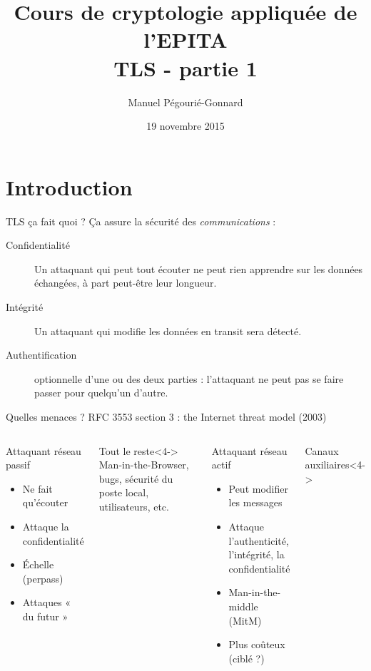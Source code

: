 \documentclass{mpg-ep-slides}
\author[MPG]{Manuel Pégourié-Gonnard}
\institute[ARM]{\normalsize ARM France - IoT - mbed TLS}
\title{Cours de cryptologie appliquée de l'EPITA \\ TLS - partie 1}
\date{19 novembre 2015}
\begin{document}
\maketitle

\section{Introduction}
\tocsect

\begin{frame}{TLS ça fait quoi ?}
  Ça assure la sécurité des \emph{communications} :
  \begin{description}
    \item[Confidentialité] Un attaquant qui peut tout écouter ne peut rien
      apprendre sur les données échangées, à part peut-être leur longueur.
    \item[Intégrité] Un attaquant qui modifie les données en transit sera
      détecté.
    \item[Authentification] optionnelle d'une ou des deux parties :
      l'attaquant ne peut pas se faire passer pour quelqu'un d'autre.
  \end{description}
\end{frame}

\begin{frame}{Quelles menaces ?}
  RFC 3553 section 3 : the Internet threat model (2003)

  \begin{columns}
    \begin{block}{Attaquant réseau passif}
      \begin{itemize}
        \item Ne fait qu'écouter
        \item Attaque la confidentialité
        \item<2-> Échelle (perpass)
        \item<3-> Attaques « du futur »
      \end{itemize}
    \end{block}

    \begin{block}{Tout le reste}<4->
      Man-in-the-Browser, bugs, sécurité du poste local, utilisateurs, etc.
    \end{block}

    \begin{block}{Attaquant réseau actif}
      \begin{itemize}
        \item Peut modifier les messages
        \item Attaque l'authenticité, l'intégrité, la confidentialité
        \item Man-in-the-middle (MitM)
        \item<2-> Plus coûteux (ciblé ?)
      \end{itemize}
    \end{block}

    \begin{block}{Canaux auxiliaires}<4->
    \end{block}
  \end{columns}
\end{frame}
\end{document}
